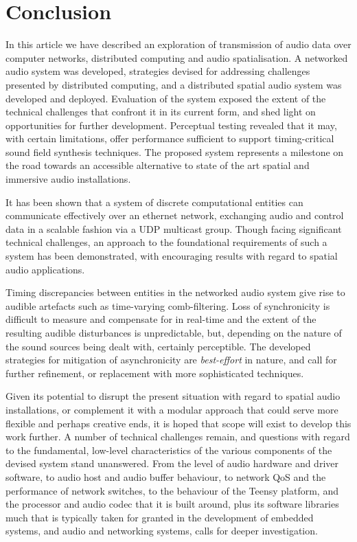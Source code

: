 \section{Conclusion}\label{sec:conclusion}

In this article we have described an exploration of transmission of audio data
over computer networks, distributed computing and audio spatialisation.
A networked audio system was developed, strategies devised for
addressing challenges presented by distributed computing, and a distributed
spatial audio system was developed and deployed.
Evaluation of the system exposed the extent of the technical challenges
that confront it in its current form, and shed light on opportunities for
further development.
Perceptual testing revealed that it may, with certain limitations, offer
performance sufficient to support timing-critical sound field synthesis
techniques.
The proposed system represents a milestone on the road towards an accessible
alternative to state of the art spatial and immersive audio installations.

It has been shown that a system of discrete computational entities can
communicate effectively over an ethernet network, exchanging audio and control
data in a scalable fashion via a UDP multicast group.
Though facing significant technical challenges, an approach to the foundational
requirements of such a system has been demonstrated, with encouraging results
with regard to spatial audio applications.

Timing discrepancies between entities in the networked audio system give rise
to audible artefacts such as time-varying comb-filtering.
Loss of synchronicity is difficult to measure and compensate for in real-time
and the extent of the resulting audible disturbances is unpredictable, but,
depending on the nature of the sound sources being dealt with, certainly
perceptible.
The developed strategies for mitigation of asynchronicity are
\textit{best-effort} in nature, and call for further refinement, or replacement
with more sophisticated techniques.

Given its potential to disrupt the present situation with regard to spatial
audio installations, or complement it with a modular approach that could serve
more flexible and perhaps creative ends, it is hoped that scope will exist to
develop this work further.
A number of technical challenges remain, and questions with regard to the
fundamental, low-level characteristics of the various components of the devised
system stand unanswered.
From the level of audio hardware and driver software, to audio host and audio
buffer behaviour, to network QoS and the performance of network switches, to
the behaviour of the Teensy platform, and the processor and audio codec that it
is built around, plus its software libraries \textemdash{} much that is
typically taken for granted in the development of embedded systems, and audio
and networking systems, calls for deeper investigation.

